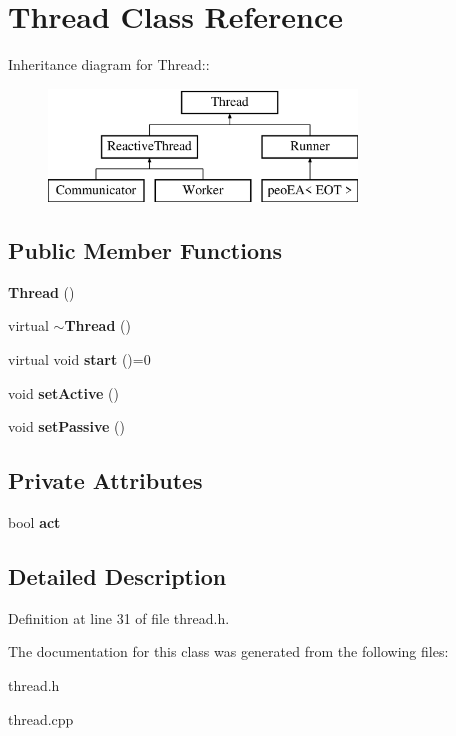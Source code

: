 \section{Thread Class Reference}
\label{class_thread}
Inheritance diagram for Thread::\begin{figure}[H]
\begin{center}
\leavevmode
\includegraphics[height=3cm]{class_thread}
\end{center}
\end{figure}
\subsection*{Public Member Functions}
\begin{CompactItemize}
\item 
{\bf Thread} ()\label{class_thread_95c703fb8f2f27cb64f475a8c940864a}

\item 
virtual {\bf $\sim$Thread} ()\label{class_thread_37d9edd3a1a776cbc27dedff949c9726}

\item 
virtual void {\bf start} ()=0\label{class_thread_c667c1d8fd7243d669043e3dd762b567}

\item 
void {\bf set\-Active} ()\label{class_thread_e197c46f8f62ecce6d2a7fe95bdc5b38}

\item 
void {\bf set\-Passive} ()\label{class_thread_20632ffe9ddfa2a478afb0c84dc1096b}

\end{CompactItemize}
\subsection*{Private Attributes}
\begin{CompactItemize}
\item 
bool {\bf act}\label{class_thread_1b155d63bca3096ac4a1d039aea83c7c}

\end{CompactItemize}


\subsection{Detailed Description}




Definition at line 31 of file thread.h.

The documentation for this class was generated from the following files:\begin{CompactItemize}
\item 
thread.h\item 
thread.cpp\end{CompactItemize}
